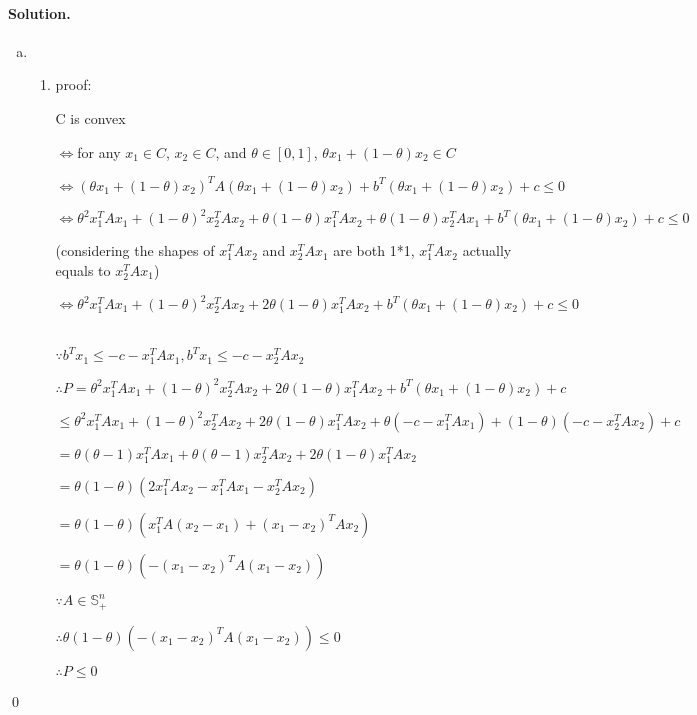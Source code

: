 \documentclass[a4paper]{article}
\newenvironment{solution}
{\color{blue} \paragraph{Solution.}}
{\newline \qed}
\begin{document}
\begin{solution}
    \begin{enumerate}[a)]
        \item 
            \begin{enumerate}[1)]
                \item proof:
                
                C is convex

                $\Leftrightarrow $for any $x_1\in C$, $x_2\in C$, and $\theta \in[0, 1]$, $\theta x_1+(1-\theta)x_2\in C$

                $\Leftrightarrow (\theta x_1+(1-\theta)x_2)^TA(\theta x_1+(1-\theta)x_2)+b^T(\theta x_1+(1-\theta)x_2)+c\leq 0$

                $\Leftrightarrow \theta^2x_1^TAx_1+(1-\theta)^2x_2^TAx_2+\theta(1-\theta)x_1^TAx_2+\theta(1-\theta)x_2^TAx_1+b^T(\theta x_1+(1-\theta)x_2)+c\leq 0$

                (considering the shapes of $x_1^TAx_2$ and $x_2^TAx_1$ are both 1*1, $x_1^TAx_2$ actually equals to $x_2^TAx_1$)

                $\Leftrightarrow \theta^2x_1^TAx_1+(1-\theta)^2x_2^TAx_2+2\theta(1-\theta)x_1^TAx_2+b^T(\theta x_1+(1-\theta)x_2)+c\leq 0$

                ~\\

                $\because b^Tx_1\leq -c-x_1^TAx_1, b^Tx_1\leq -c-x_2^TAx_2$
                    
                $\therefore P = \theta^2x_1^TAx_1+(1-\theta)^2x_2^TAx_2+2\theta(1-\theta)x_1^TAx_2+b^T(\theta x_1+(1-\theta)x_2)+c$

                $\leq \theta^2x_1^TAx_1+(1-\theta)^2x_2^TAx_2+2\theta(1-\theta)x_1^TAx_2+\theta(-c-x_1^TAx_1)+(1-\theta)(-c-x_2^TAx_2)+c$

                $= \theta(\theta-1)x_1^TAx_1+\theta(\theta-1)x_2^TAx_2+2\theta(1-\theta)x_1^TAx_2$

                $= \theta(1-\theta)(2x_1^TAx_2-x_1^TAx_1-x_2^TAx_2)$

                $= \theta(1-\theta)(x_1^TA(x_2-x_1)+(x_1-x_2)^TAx_2)$

                $= \theta(1-\theta)(-(x_1-x_2)^TA(x_1-x_2))$

                $\because A\in \mathbb{S}_+^n$

                $\therefore \theta(1-\theta)(-(x_1-x_2)^TA(x_1-x_2))\leq 0$

                $\therefore P \leq 0$


\end{enumerate}
\end{enumerate}
\end{solution}
\end{document}

